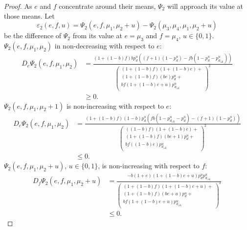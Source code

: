 \documentclass[prodmode,acmtissec]{acmsmall}
\begin{document}
\begin{proof}
As $e$ and $f$ concentrate around their means, $\Psi_2$ will approach its value at those means.  Let
\begin{equation*}
\varepsilon_2(e,f,u) = \Psi_2(e,f,\mu_1,\mu_2+u) - \Psi_2(\mu_3,\mu_4,\mu_1,\mu_2+u)
\end{equation*}
be the difference of $\Psi_2$ from its value at $e=\mu_3$ and $f=\mu_4$, $u\in \{0,1\}$.  $\Psi_2(e,f,\mu_1,\mu_2)$ in non-decreasing with respect to $e$:
\begin{align*}
D_e \Psi_2(e,f,\mu_1,\mu_2) &= \frac{(1+(1-b) f) b p^u_d  ((f+1)(1-p^u_d) - fb(1-p^u_d-p^u_{d_{|\Delta|}}))}{\left( \begin{array}{l} (1+(1-b)f)(1+(1-b)e) + \\ (1+(1-b) f)(be)p^u_d + \\ b f (1+(1-b) e+u) p^u_{d_{|\Delta|}} \end{array} \right)^2}\\
&\ge 0.
\end{align*}
$\Psi_2(e,f,\mu_1,\mu_2+1)$ is non-increasing with respect to $e$:
\begin{align*}
D_e \Psi_2(e,f,\mu_1,\mu_2) &= \frac{(1+(1-b) f) (1-b) p^u_d  (fb(1-p^u_{d_{|\Delta|}}-p^u_d)-(f+1)(1-p^u_d))}{\left( \begin{array}{l} ((1-b)f)(1+(1-b)e) + \\ (1+(1-b) f)(be+1)p^u_d + \\ b f ((1-b) e) p^u_{d_{|\Delta|}} \end{array} \right)^2}\\
&\le 0.
\end{align*}
$\Psi_2(e,f,\mu_1,\mu_2+u)$, $u\in \{0,1\}$, is non-increasing with respect to $f$:
\begin{align*}
D_f \Psi_2(e,f,\mu_1,\mu_2+u) &= \frac{ - b(1+e)(1+(1-b) e+u) p^u_d p^u_{d_{|\Delta|}} }{\left( \begin{array}{l} (1+(1-b)f)(1+(1-b)e+u) +\\  (1+(1-b)f)(be+u)p^u_d + \\ bf(1+(1-b)e+u)p^u_{d_{|\Delta|}} \end{array} \right)^2}\\
&\le 0.
\end{align*}


\end{proof}
\end{document}
